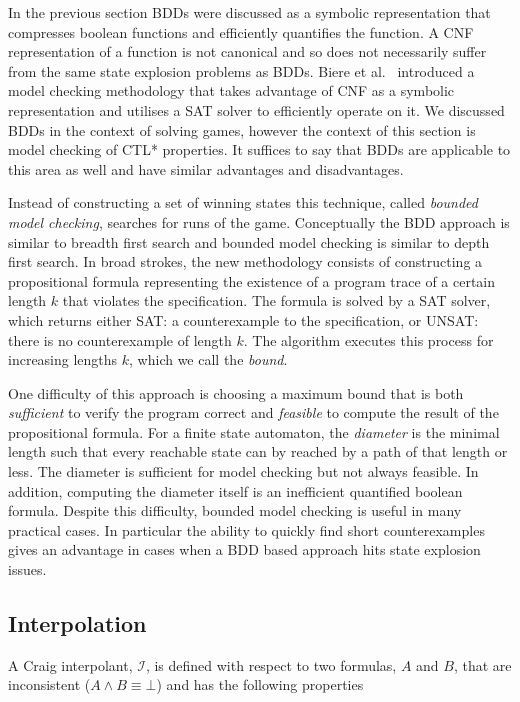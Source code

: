 In the previous section BDDs were discussed as a symbolic representation that compresses boolean functions and efficiently quantifies the function. A CNF representation of a function is not canonical and so does not necessarily suffer from the same state explosion problems as BDDs. Biere et al.~\cite{Biere99} introduced a model checking methodology that takes advantage of CNF as a symbolic representation and utilises a SAT solver to efficiently operate on it. We discussed BDDs in the context of solving games, however the context of this section is model checking of CTL* properties. It suffices to say that BDDs are applicable to this area as well and have similar advantages and disadvantages.

Instead of constructing a set of winning states this technique, called \emph{bounded model checking}, searches for runs of the game. Conceptually the BDD approach is similar to breadth first search and bounded model checking is similar to depth first search. In broad strokes, the new methodology consists of constructing a propositional formula representing the existence of a program trace of a certain length $k$ that violates the specification. The formula is solved by a SAT solver, which returns either SAT: a counterexample to the specification, or UNSAT: there is no counterexample of length $k$. The algorithm executes this process for increasing lengths $k$, which we call the \emph{bound}.

One difficulty of this approach is choosing a maximum bound that is both \emph{sufficient} to verify the program correct and \emph{feasible} to compute the result of the propositional formula. For a finite state automaton, the \emph{diameter} is the minimal length such that every reachable state can by reached by a path of that length or less. The diameter is sufficient for model checking but not always feasible. In addition, computing the diameter itself is an inefficient quantified boolean formula. Despite this difficulty, bounded model checking is useful in many practical cases. In particular the ability to quickly find short counterexamples gives an advantage in cases when a BDD based approach hits state explosion issues.

\subsection{Interpolation}
\label{sec:backgroundInterpolation}

A Craig interpolant, $\mathcal{I}$, is defined with respect to two formulas, $A$ and $B$, that are inconsistent ($A \land B \equiv \bot$) and has the following properties

